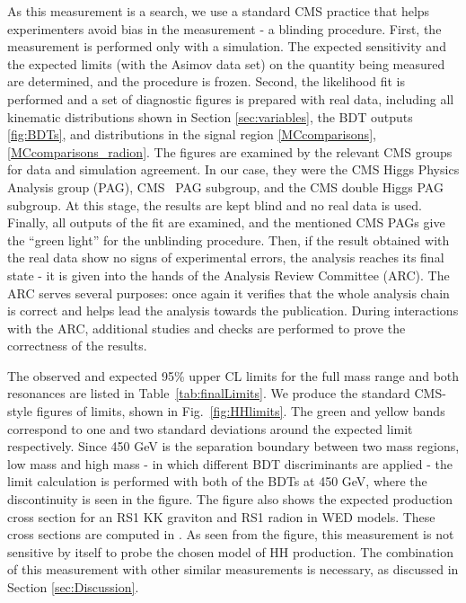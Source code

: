 As this measurement is a search, we use a standard CMS practice that helps experimenters avoid bias in the measurement - a blinding procedure. First, the measurement is performed only with a simulation. The expected sensitivity and the expected limits (with the Asimov data set) on the quantity being measured are determined, and the procedure is frozen. Second, the likelihood fit is performed and a set of diagnostic figures is prepared with real data, including all kinematic distributions shown in Section \ref{sec:variables}, the BDT outputs \ref{fig:BDTs}, and \mTHH distributions in the signal region \ref{MCcomparisons}, \ref{MCcomparisons_radion}. The figures are examined by the relevant CMS groups for data and simulation agreement. In our case, they were the CMS Higgs Physics Analysis group (PAG), CMS \HZZ~PAG subgroup, and the CMS double Higgs PAG subgroup. At this stage, the results are kept blind and no real data is used. Finally, all outputs of the fit are examined, and the mentioned CMS PAGs give the ``green light'' for the unblinding procedure. Then, if the result obtained with the real data show no signs of experimental errors, the analysis reaches its final state - it is given into the hands of the Analysis Review Committee (ARC). The ARC serves several purposes: once again it verifies that the whole analysis chain is correct and helps lead the analysis towards the publication. During interactions with the ARC, additional studies and checks are performed to prove the correctness of the results. 

The observed and expected 95\% upper CL limits for the full mass range and both resonances are listed in Table~\ref{tab:finalLimits}. We produce the standard CMS-style figures of limits, shown in Fig.~\ref{fig:HHlimits}. The green and yellow bands correspond to one and two standard deviations around the expected limit respectively. Since 450 GeV is the separation boundary between two mass regions, low mass and high mass - in which different BDT discriminants are applied - the limit calculation is performed with both of the BDTs at 450 GeV, where the discontinuity is
seen in the figure. The figure also shows the expected production cross section for an RS1 KK graviton and RS1 radion in WED models. These cross sections are computed in \cite{Oliveira:2014kla}. As seen from the figure, this measurement is not sensitive by itself to probe the chosen model of HH production. The combination of this measurement with other similar measurements is necessary, as discussed in Section \ref{sec:Discussion}.

